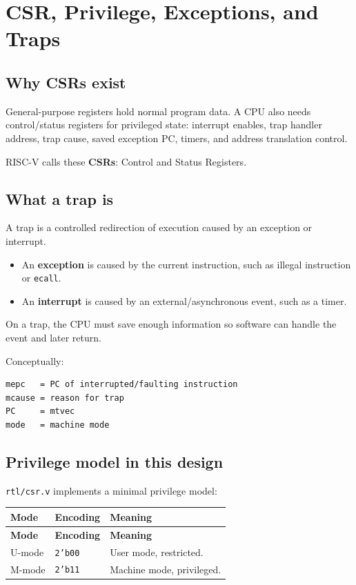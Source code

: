 \section{CSR, Privilege, Exceptions, and Traps}

\subsection{Why CSRs exist}

General-purpose registers hold normal program data. A CPU also needs control/status registers for privileged state: interrupt enables, trap handler address, trap cause, saved exception PC, timers, and address translation control.

RISC-V calls these \textbf{CSRs}: Control and Status Registers.

\subsection{What a trap is}

A trap is a controlled redirection of execution caused by an exception or interrupt.

\begin{itemize}
\item An \textbf{exception} is caused by the current instruction, such as illegal instruction or \texttt{ecall}.
\item An \textbf{interrupt} is caused by an external/asynchronous event, such as a timer.
\end{itemize}
On a trap, the CPU must save enough information so software can handle the event and later return.

Conceptually:

\begin{lstlisting}[language={}]
mepc   = PC of interrupted/faulting instruction
mcause = reason for trap
PC     = mtvec
mode   = machine mode
\end{lstlisting}

\subsection{Privilege model in this design}

\texttt{rtl/csr.v} implements a minimal privilege model:

\begin{longtable}{|>{\RaggedRight\arraybackslash}p{}|>{\RaggedRight\arraybackslash}p{}|>{\RaggedRight\arraybackslash}p{}|}
\hline
\textbf{Mode} & \textbf{Encoding} & \textbf{Meaning} \\
\hline
\endfirsthead
\hline
\textbf{Mode} & \textbf{Encoding} & \textbf{Meaning} \\
\hline
\endhead
U-mode & \texttt{2'b00} & User mode, restricted. \\
\hline
M-mode & \texttt{2'b11} & Machine mode, privileged. \\
\hline
\end{longtable}

